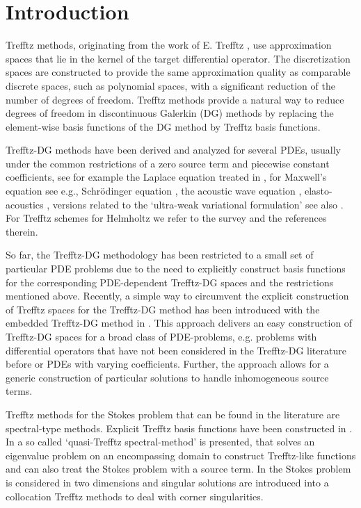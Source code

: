 \documentclass[sn-mathphys,Numbered]{sn-jnl}%
\theoremstyle{remark}%
\theoremstyle{definition}%
\begin{document}
\section{Introduction}
Trefftz methods, originating from the work of E. Trefftz \cite{trefftz1926}, use approximation spaces that lie in the kernel of the target differential operator. 
The discretization spaces are constructed to provide the same approximation quality as comparable discrete spaces, such as polynomial spaces, with a significant reduction of the number of degrees of freedom.
Trefftz methods provide a natural way to reduce degrees of freedom in discontinuous Galerkin (DG) methods by replacing the element-wise basis functions of the DG method by Trefftz basis functions. 

Trefftz-DG methods have been derived and analyzed for several PDEs, usually under the common restrictions of a zero source term and piecewise constant coefficients, see for example the Laplace equation treated in \cite{HMPS14},  %
for Maxwell's equation see e.g.\cite{EKSW15, Huttunen},
Schr\"odinger equation \cite{2306.09571,21M1426079},
the acoustic wave equation \cite{mope18,bgl2016},
elasto-acoustics \cite{bcds20},
versions related to the `ultra-weak variational formulation' see also \cite{SpaceTimeTDG,mope18,bcds20,KSTW2014,EKSW15,tpwave,cessenat1996}.
For Trefftz schemes for Helmholtz we refer to the survey \cite{TrefftzSurvey} and the references therein.

So far, the Trefftz-DG methodology has been restricted to a small set of particular PDE problems due to the need to explicitly construct basis functions for the corresponding PDE-dependent Trefftz-DG spaces and the restrictions mentioned above.  
Recently, a simple way to circumvent the explicit construction of Trefftz spaces for the Trefftz-DG method has been introduced with the embedded Trefftz-DG method in \cite{2201.07041}. 
This approach delivers an easy construction of Trefftz-DG spaces for a broad class of PDE-problems, e.g. problems with differential operators that have not been considered in the Trefftz-DG literature before or PDEs with varying coefficients. Further, the approach allows for a generic construction of particular solutions to handle inhomogeneous source terms.

Trefftz methods for the Stokes problem that can be found in the literature are spectral-type methods. 
Explicit Trefftz basis functions have been constructed in \cite{POITOU2000561,Bouberbachene}. 
In \cite{LifitsQTSM} a so called `quasi-Trefftz spectral-method' is presented, that solves an eigenvalue problem on an encompassing domain to construct Trefftz-like functions and can also treat the Stokes problem with a source term. 
In \cite{21710} the Stokes problem is considered in two dimensions and singular solutions are introduced into a collocation Trefftz methods to deal with corner singularities.
\end{document}
